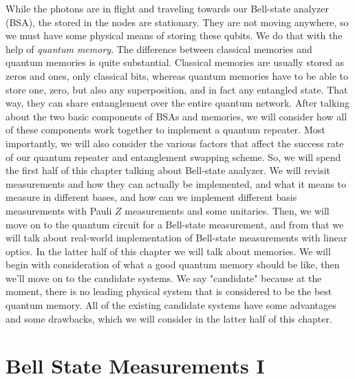 While the photons are in flight and traveling towards our Bell-state analyzer (BSA), the stored in the nodes are stationary. They are not moving anywhere, so we must have some physical means of storing these qubits. We do that with the help of \emph{quantum memory}. The difference between classical memories and quantum memories is quite substantial. Classical memories are usually stored as zeros and ones, only classical bits, whereas quantum memories have to be able to store one, zero, but also any superposition, and in fact any entangled state. That way, they can share entanglement over the entire quantum network. After talking about the two basic components of BSAs and memories, we will consider how all of these components work together to implement a quantum repeater. Most importantly, we will also consider the various factors that affect the success rate of our quantum repeater and entanglement swapping scheme. So, we will spend the first half of this chapter talking about Bell-state analyzer. We will revisit measurements and how they can actually be implemented, and what it means to measure in different bases, and how can we implement different basis measurements with Pauli $Z$ measurements and some unitaries. Then, we will move on to the quantum circuit for a Bell-state measurement, and from that we will talk about real-world implementation of Bell-state measurements with linear optics.  In the latter half of this chapter we will talk about memories. We will begin with consideration of what a good quantum memory should be like, then we'll move on to the candidate systems.  We say "candidate" because at the moment, there is no leading physical system that is considered to be the best quantum memory. All of the existing candidate systems have some advantages and some drawbacks, which we will consider in the latter half of this chapter.



\section{Bell State Measurements I}

